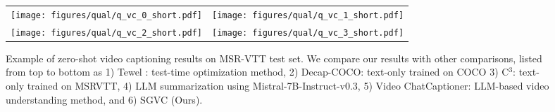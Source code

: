 
\begin{figure*}[!t]
    \centering
        \begin{tabular}{@{}cc@{}}
            \texttt{[image: figures/qual/q\_vc\_0\_short.pdf]} & 
            \texttt{[image: figures/qual/q\_vc\_1\_short.pdf]} \\
            \texttt{[image: figures/qual/q\_vc\_2\_short.pdf]} &
            \texttt{[image: figures/qual/q\_vc\_3\_short.pdf]} \\

        \end{tabular}
    \vspace{-2mm}
    \caption{Example of zero-shot video captioning results on MSR-VTT test set. We compare our results with other comparisons, listed from top to bottom as 1) Tewel \etal: test-time optimization method, 2) Decap-COCO: text-only trained on COCO 3) C$^{3}$: text-only trained on MSRVTT, 4) LLM summarization using Mistral-7B-Instruct-v0.3, 5) Video ChatCaptioner: LLM-based video understanding method, and 6) SGVC (Ours).}
    \label{fig:qual_vc}
    \vspace{-2mm}
\end{figure*}